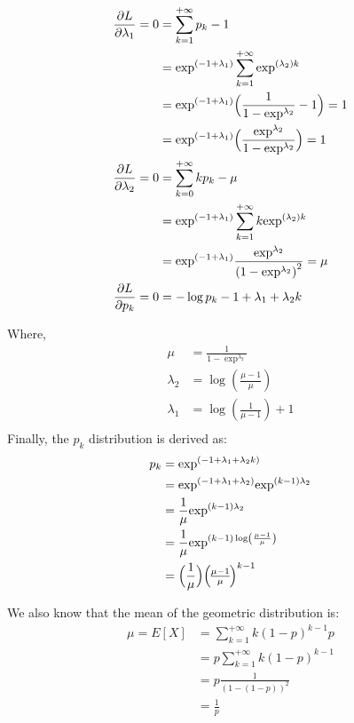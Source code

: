 \documentclass[11pt]{article}
\makeatletter
\newcommand{\Lagr}{L}
\newenvironment{proofw}{\par
	\pushQED{\qed}%
	\normalfont \topsep6\p@\@plus6\p@\relax
	\trivlist
	\item[]\ignorespaces
}{%
	\popQED\endtrivlist\@endpefalse
}
\makeatother
\begin{document}
\begin{proofw}
\begin{equation*}
\begin{split}
\pdv{\Lagr}{\lambda_{1}} = 0 &= \sum_{k=1}^{+\infty} p_{k}-1\\
& = {\exp}^{(-1+\lambda_{1})} \sum_{k=1}^{+\infty} {\exp}^{(\lambda_{2})k}\\
&= {\exp}^{(-1 + \lambda_{1})}\Big(\frac{1}{1-{\exp}^{\lambda_{2}}}-1\Big) = 1\\
&= {\exp}^{(-1 + \lambda_{1})}\Big(\frac{{\exp}^{\lambda_{2}}}{1-{\exp}^{\lambda_{2}}}\Big) = 1\\
\pdv{\Lagr}{\lambda_{2}} = 0 &= \sum_{k=0}^{+\infty}kp_{k}-\mu\\
&={\exp}^{(-1+\lambda_{1})}  \sum_{k=1}^{+\infty}k {\exp}^{(\lambda_{2})k}\\
&={\exp}^{(-1+\lambda_{1})}  \frac{{\exp}^{\lambda_{2}}}{{(1-{\exp}^{\lambda_{2}})}^2} = \mu\\
\pdv{\Lagr}{p_{k}} = 0 &= - \log p_{k}-1 + \lambda_{1} +\lambda_{2}k \\
\end{split}
\end{equation*}

Where, 
\begin{equation*}
\begin{split}
\mu &= \frac{1}{1 - {\exp}^{\lambda_{2}}}\\
\lambda_{2} &= \log(\frac{\mu - 1}{\mu})\\
\lambda_{1} &= \log(\frac{1}{\mu-1})+1\\
\end{split}
\end{equation*}
Finally, the $p_{k}$ distribution is derived as:
\begin{equation}\label{lm}
\begin{split}
p_{k} &= {\exp}^{(-1 +\lambda_{1}+\lambda_{2}k)}\\
&= {\exp}^{(-1 +\lambda_{1}+\lambda_{2})}{\exp}^{(k-1)\lambda_{2}}\\
&= \frac{1}{\mu}{\exp}^{(k-1)\lambda_{2}}\\
&= \frac{1}{\mu}{\exp}^{(k-1)\log(\frac{\mu-1}{\mu})}\\
&= \Big(\frac{1}{\mu}\Big)\Big{(\frac{\mu-1}{\mu}\Big)}^{k-1}
\end{split}
\end{equation}

We also know that the mean of the geometric distribution is:
\begin{equation}\label{mean}
\begin{split}
\mu = E[X] &= \sum_{k=1}^{+\infty} k{(1-p)}^{k-1}p\\
&= p \sum_{k=1}^{+\infty} k{(1-p)}^{k-1}\\
&= p \frac{1}{{(1-(1-p))}^{2}}\\
&= \frac{1}{p}
\end{split}
\end{equation}


\end{proofw}
\end{document}
